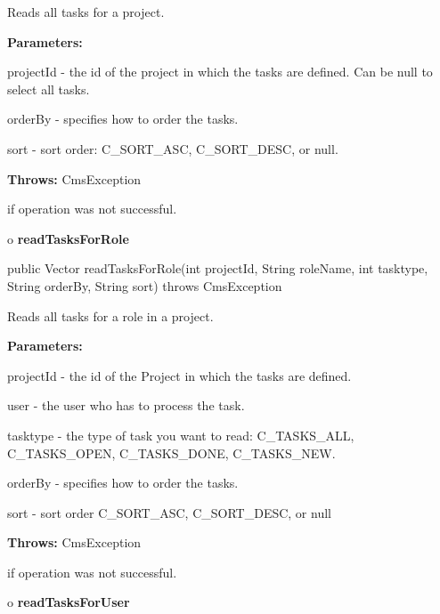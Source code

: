 \begin{description}
\htmlDD Reads all tasks for a project. 

\begin{description}
\item {\bf Parameters:}  

projectId - the id of the project in which the tasks are defined. Can be null
to select all tasks.  

orderBy - specifies how to order the tasks.  

sort - sort order: C\_SORT\_ASC, C\_SORT\_DESC, or null.  
\item {\bf Throws:} CmsException  

if operation was not successful.  
\end{description}

\end{description}

o {\bf readTasksForRole} 

\begin{PRE}
 public Vector readTasksForRole(int projectId,
                                String roleName,
                                int tasktype,
                                String orderBy,
                                String sort) throws CmsException
\end{PRE}

\begin{description}
\htmlDD Reads all tasks for a role in a project. 

\begin{description}
\item {\bf Parameters:}  

projectId - the id of the Project in which the tasks are defined.  

user - the user who has to process the task.  

tasktype - the type of task you want to read: C\_TASKS\_ALL, C\_TASKS\_OPEN,
C\_TASKS\_DONE, C\_TASKS\_NEW.  

orderBy - specifies how to order the tasks.  

sort - sort order C\_SORT\_ASC, C\_SORT\_DESC, or null  
\item {\bf Throws:} CmsException  

if operation was not successful.  
\end{description}

\end{description}

o {\bf readTasksForUser} 

